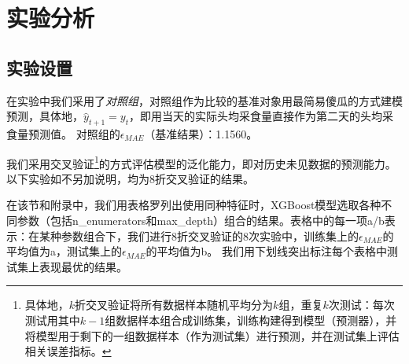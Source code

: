 \section{实验分析}
\label{evaluation}

\subsection{实验设置}

在实验中我们采用了\emph{对照组}，对照组作为比较的基准对象用最简易傻瓜的方式建模预测，具体地，$\hat y_{t+1} = y_t$，即用当天的实际头均采食量直接作为第二天的头均采食量预测值。
对照组的$\epsilon_{MAE}$（基准结果）：1.1560。

我们采用交叉验证\footnote{具体地，$k$折交叉验证将所有数据样本随机平均分为$k$组，重复$k$次测试：每次测试用其中$k-1$组数据样本组合成训练集，训练构建得到模型（预测器），并将模型用于剩下的一组数据样本（作为测试集）进行预测，并在测试集上评估相关误差指标。}的方式评估模型的泛化能力，即对历史未见数据的预测能力。以下实验如不另加说明，均为8折交叉验证的结果。

在该节和附录中，我们用表格罗列出使用同种特征时，XGBoost模型选取各种不同参数（包括n\_enumerators和max\_depth）组合的结果。表格中的每一项a/b表示：在某种参数组合下，我们进行8折交叉验证的8次实验中，训练集上的$\epsilon_{MAE}$的平均值为a，测试集上的$\epsilon_{MAE}$的平均值为b。
我们用下划线突出标注每个表格中测试集上表现最优的结果。




